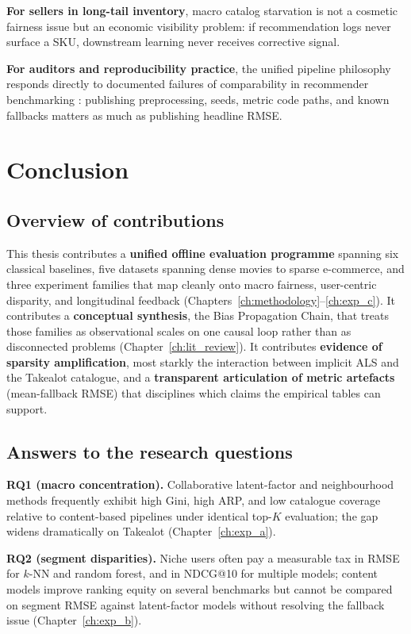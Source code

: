 \textbf{For sellers in long-tail inventory}, macro catalog starvation is not a cosmetic fairness issue but an economic visibility problem: if recommendation logs never surface a SKU, downstream learning never receives corrective signal.

\textbf{For auditors and reproducibility practice}, the unified pipeline philosophy responds directly to documented failures of comparability in recommender benchmarking \citep{ferrari2019progress}: publishing preprocessing, seeds, metric code paths, and known fallbacks matters as much as publishing headline RMSE.

\chapter{Conclusion}
\label{ch:conclusion_final}

\section{Overview of contributions}
This thesis contributes a \textbf{unified offline evaluation programme} spanning six classical baselines, five datasets spanning dense movies to sparse e-commerce, and three experiment families that map cleanly onto macro fairness, user-centric disparity, and longitudinal feedback (Chapters~\ref{ch:methodology}--\ref{ch:exp_c}). It contributes a \textbf{conceptual synthesis}, the Bias Propagation Chain, that treats those families as observational scales on one causal loop rather than as disconnected problems (Chapter~\ref{ch:lit_review}). It contributes \textbf{evidence of sparsity amplification}, most starkly the interaction between implicit ALS and the Takealot catalogue, and a \textbf{transparent articulation of metric artefacts} (mean-fallback RMSE) that disciplines which claims the empirical tables can support.

\section{Answers to the research questions}
\textbf{RQ1 (macro concentration).} Collaborative latent-factor and neighbourhood methods frequently exhibit high Gini, high ARP, and low catalogue coverage relative to content-based pipelines under identical top-$K$ evaluation; the gap widens dramatically on Takealot (Chapter~\ref{ch:exp_a}).

\textbf{RQ2 (segment disparities).} Niche users often pay a measurable tax in RMSE for $k$-NN and random forest, and in NDCG@10 for multiple models; content models improve ranking equity on several benchmarks but cannot be compared on segment RMSE against latent-factor models without resolving the fallback issue (Chapter~\ref{ch:exp_b}).

